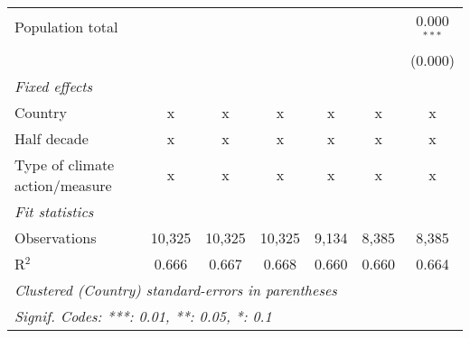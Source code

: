 \begin{tabular}{lcccccc}
   Population total                                                  &         &               &                &                &                & 0.000$^{***}$\\   
                                                                     &         &               &                &                &                & (0.000)\\   
   \emph{Fixed effects}\\
   Country                                                           & x       & x             & x              & x              & x              & x\\  
   Half decade                                                       & x       & x             & x              & x              & x              & x\\  
   Type of climate action/measure                                    & x       & x             & x              & x              & x              & x\\  
   \midrule \emph{Fit statistics}\\
   Observations                                                      & 10,325  & 10,325        & 10,325         & 9,134          & 8,385          & 8,385\\  
   R$^2$                                                             & 0.666   & 0.667         & 0.668          & 0.660          & 0.660          & 0.664\\  
   \midrule
   \multicolumn{7}{l}{\emph{Clustered (Country) standard-errors in parentheses}}\\
   \multicolumn{7}{l}{\emph{Signif. Codes: ***: 0.01, **: 0.05, *: 0.1}}\\
\end{tabular}
\par\endgroup


